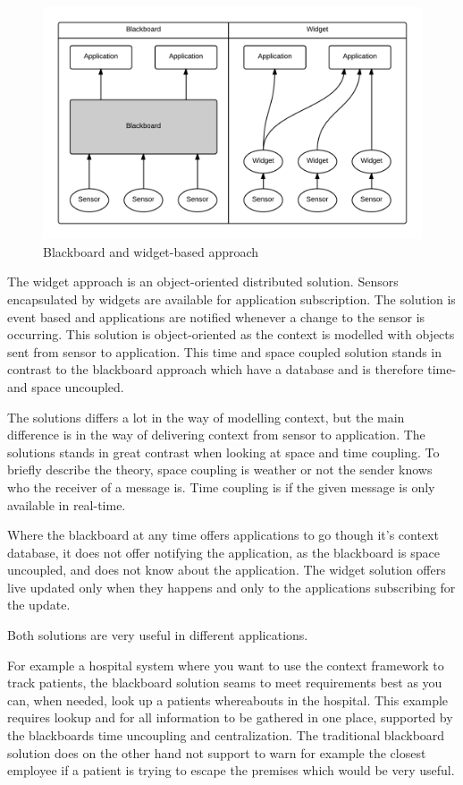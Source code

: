 \documentclass[../report.tex]{subfiles}
\begin{document}
\begin{figure}
\centering
\includegraphics[width=\linewidth]{blackboard-widget.png}
\caption{Blackboard and widget-based approach}
\label{fig:blackboard-widget}
\end{figure}

The widget approach is an object-oriented distributed solution. Sensors encapsulated by widgets are available for application subscription. The solution is event based and applications are notified whenever a change to the sensor is occurring. This solution is object-oriented as the context is modelled with objects sent from sensor to application. This time and space coupled solution stands in contrast to the blackboard approach which have a database and is therefore time- and space uncoupled.

The solutions differs a lot in the way of modelling context, but the main difference is in the way of delivering context from sensor to application. The solutions stands in great contrast when looking at space and time coupling. To briefly describe the theory, space coupling is weather or not the sender knows who the receiver of a message is. Time coupling is if the given message is only available in real-time. 

Where the blackboard at any time offers applications to go though it's context database, it does not offer notifying the application, as the blackboard is space uncoupled, and does not know about the application. The widget solution offers live updated only when they happens and only to the applications subscribing for the update.

Both solutions are very useful in different applications.

For example a hospital system where you want to use the context framework to track patients, the blackboard solution seams to meet requirements best as you can, when needed, look up a patients whereabouts in the hospital.
This example requires lookup and for all information to be gathered in one place, supported by the blackboards time uncoupling and centralization. The traditional blackboard solution does on the other hand not support to warn for example the closest employee if a patient is trying to escape the premises which would be very useful.
\end{document}
